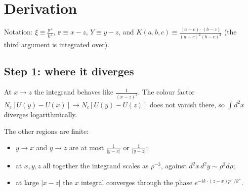 \documentclass[10pt]{article}
\numberwithin{equation}{section}
\begin{document}
\section{Derivation}\label{sec:der}
Notation: $\xi\equiv\frac{p^+}{k^+}$, $\mathbf r\equiv x-z$, $Y\equiv y-z$, and $K(a,b,c)\equiv\frac{(a-c)\cdot(b-c)}{(a-c)^2(b-c)^2}$ (the third argument is integrated over).

\subsection*{Step 1: where it diverges}
At $x\to z$ the integrand behaves like $\frac{1}{(x-z)^2}$. The colour factor $N_c[U(y)-U(x)]\to N_c[U(y)-U(z)]$ does not vanish there, so $\int d^2x$ diverges logarithmically.

The other regions are finite:
\begin{itemize}
\item $y\to x$ and $y\to z$ are at most $\frac1{|y-x|}$ or $\frac1{|y-z|}$;
\item at $x,y,z$ all together the integrand scales as $\rho^{-3}$, against $d^2x\,d^2y\sim\rho^3d\rho$;
\item at large $|x-z|$ the $x$ integral converges through the phase $e^{-ik\cdot(z-x)p^+/k^+}$.
\end{itemize}
\end{document}

